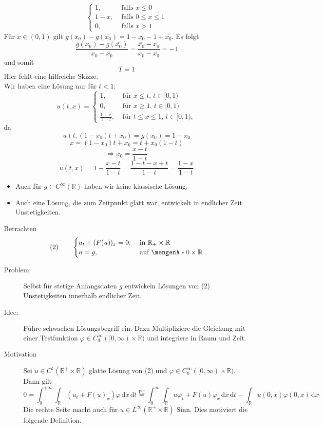 \begin{enumerate}[1.)]
\begin{beispiel}
\[\begin{cases}
				1, &\text{ falls }x \leq 0\\
				1-x, &\text{ falls } 0 \leq x \leq 1 \\
				0, &\text{ falls }x >1
			\end{cases}
		\]
		Für $x \in (0,1)$ gilt $g(x_0) - g(\bar{x_0}) = 1 - x_0 - 1+ \bar{x_0}$.
		Es folgt
		\[
			\frac{g(x_0)-g(\bar{x_0})}{x_0- \bar{x_0}} = \frac{\bar{x_0}-x_0}{x_0-\bar{x_0}} = -1
		\]
		und somit
		\[
			T=1
		\]
		Hier fehlt eine hilfreiche Skizze.  \\
		Wir haben eine Lösung nur für $t<1:$
		\[
			u(t,x) = \begin{cases}
				1, &\text{ für }x \leq t, \, t \in [0,1)\\
				0, &\text{ für }x \geq 1, \, t \in [0,1)\\
				\frac{1-x}{1-t},& \text{ für }t \leq x \leq 1, \, t \in [0,1),
			\end{cases}
		\]
		da 
		\[
			u(t,(1-x_0)t+x_0) = g(x_0) = 1-x_0
		\]
		\[
			x = (1-x_0)t + x_0 = t + x_0 (1-t)
		\]
		\[
			\Rightarrow x_0 = \frac{x-t}{1-t}
		\]
		\[
			u(t,x)= 1- \frac{x-t}{1-t} = \frac{1-t-x+t}{1-t} = \frac{1-x}{1-t}
		\]
	\end{beispiel}
	\begin{bemerkung}
		\begin{itemize}
			\item Auch für $g \in C^{\infty}(\mathbb{R})$ haben wir keine klassische Lösung.
			\item Auch eine Lösung, die zum Zeitpunkt glatt war, entwickelt in endlicher Zeit Unstetigkeiten.
		\end{itemize}
	\end{bemerkung}
\end{enumerate}
Betrachten 
\[
	(2) \qquad \begin{cases}
		u_t + (F(u))_x = 0, &\text{ in }\mathbb{R}_+ \times \mathbb{R}\\
		u=g , &\text{ auf } \set{0} \times \mathbb{R}
	\end{cases}
\]
\begin{description}
	\item[Problem:]Selbst für stetige Anfangsdaten $g$ entwickeln Lösungen von (2) Unstetigkeiten innerhalb endlicher Zeit.
	\item[Idee:] Führe schwachen Lösungsbegriff ein. Dazu Multipliziere die Gleichung mit einer Testfunktion $\varphi \in C^{\infty}_0([0,\infty) \times \mathbb{R})$
	und integriere in Raum und Zeit.
	\item[Motivation] Sei $u \in C^1(\mathbb{R}^+ \times \mathbb{R})$ glatte Lösung von (2) und $\varphi \in C^{\infty}_0([0, \infty) \times \mathbb{R})$. Dann gilt
	\[
		0 = \int_{0}^{+ \infty} \int_{\mathbb{R}}^{} (u_t + F(u)_x) \varphi \,\mathrm{d}x \,\mathrm{d}t \stackrel{\text{P.I}}{=} \int_{0}^{\infty} \int_{\mathbb{R}}^{}
		u \varphi_t + F(u) \varphi_x \,\mathrm{d}x \,\mathrm{d}t - \int_{\mathbb{R}}^{} u(0,x)\varphi(0,x) \,\mathrm{d}x
	\] 
	Die rechte Seite macht auch für $u \in L^{\infty}(\mathbb{R}^+ \times \mathbb{R})$ Sinn. Dies motiviert die folgende Definition.
\end{description}
